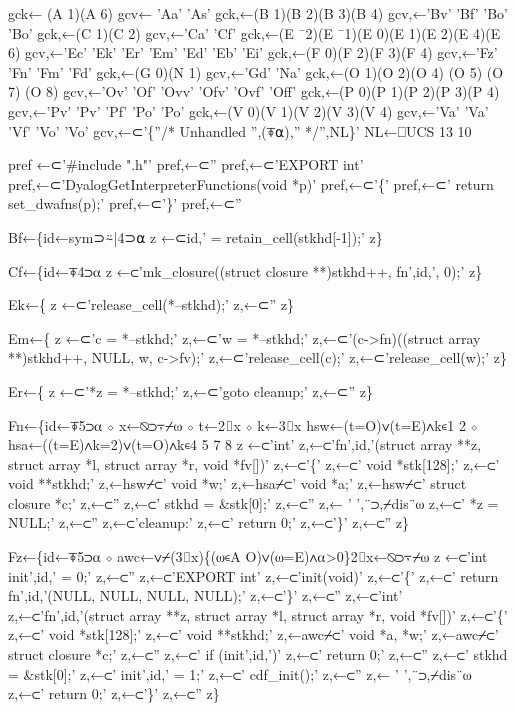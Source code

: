 \documentclass{article}%
\begin{document}
  gck← (A 1)(A 6)
  gcv← 'Aa' 'As'
  gck,←(B 1)(B 2)(B 3)(B 4)
  gcv,←'Bv' 'Bf' 'Bo' 'Bo'
  gck,←(C 1)(C 2)
  gcv,←'Ca' 'Cf'
  gck,←(E ¯2)(E ¯1)(E 0)(E 1)(E 2)(E 4)(E 6)
  gcv,←'Ec'  'Ek'  'Er' 'Em' 'Ed' 'Eb' 'Ei'
  gck,←(F 0)(F 2)(F 3)(F 4)
  gcv,←'Fz' 'Fn' 'Fm' 'Fd'
  gck,←(G 0)(N 1)
  gcv,←'Gd' 'Na'
  gck,←(O 1)(O 2)(O 4) (O 5) (O 7) (O 8)
  gcv,←'Ov' 'Of' 'Ovv' 'Ofv' 'Ovf' 'Off'
  gck,←(P 0)(P 1)(P 2)(P 3)(P 4)
  gcv,←'Pv' 'Pv' 'Pf' 'Po' 'Po'
  gck,←(V 0)(V 1)(V 2)(V 3)(V 4)
  gcv,←'Va' 'Va' 'Vf' 'Vo' 'Vo'
  gcv,←⊂'\{''/* Unhandled '',(⍕⍺),'' */'',NL\}'
  NL←⎕UCS 13 10

  pref ←⊂'#include ".h"'
  pref,←⊂''
  pref,←⊂'EXPORT int'
  pref,←⊂'DyalogGetInterpreterFunctions(void *p)'
  pref,←⊂'\{'
  pref,←⊂'  return set_dwafns(p);'
  pref,←⊂'\}'
  pref,←⊂''

  Bf←\{id←sym⊃⍨|4⊃⍺
    z ←⊂id,' = retain_cell(stkhd[-1]);'
  z\}

  Cf←\{id←⍕4⊃⍺
    z ←⊂'mk_closure((struct closure **)stkhd++, fn',id,', 0);'
  z\}

  Ek←\{
    z ←⊂'release_cell(*--stkhd);'
    z,←⊂''
  z\}

  Em←\{
    z ←⊂'c = *--stkhd;'
    z,←⊂'w = *--stkhd;'
    z,←⊂'(c->fn)((struct array **)stkhd++, NULL, w, c->fv);'
    z,←⊂'release_cell(c);'
    z,←⊂'release_cell(w);'
  z\}

  Er←\{
    z ←⊂'*z = *--stkhd;'
    z,←⊂'goto cleanup;'
    z,←⊂''
  z\}

  Fn←\{id←⍕5⊃⍺ ⋄ x←⍉⊃⍪⌿⍵ ⋄ t←2⌷x ⋄ k←3⌷x
    hsw←(t=O)∨(t=E)∧k∊1 2 ⋄ hsa←((t=E)∧k=2)∨(t=O)∧k∊4 5 7 8
    z ←⊂'int'
    z,←⊂'fn',id,'(struct array **z, struct array *l, struct array *r, void *fv[])'
    z,←⊂'\{'
    z,←⊂'   void    *stk[128];'
    z,←⊂'   void    **stkhd;'
    z,←hsw⌿⊂'     void    *w;'
    z,←hsa⌿⊂'     void    *a;'
    z,←hsw⌿⊂'     struct  closure *c;'
    z,←⊂''
    z,←⊂'   stkhd = &stk[0];'
    z,←⊂''
    z,← '     ',¨⊃,⌿dis¨⍵
    z,←⊂'   *z = NULL;'
    z,←⊂''
    z,←⊂'cleanup:'
    z,←⊂'   return 0;'
    z,←⊂'\}'
    z,←⊂''
  z\}

  Fz←\{id←⍕5⊃⍺ ⋄ awc←∨⌿(3⌷x)\{(⍵∊A O)∨(⍵=E)∧⍺>0\}2⌷x←⍉⊃⍪⌿⍵
    z ←⊂'int init',id,' = 0;'
    z,←⊂''
    z,←⊂'EXPORT int'
    z,←⊂'init(void)'
    z,←⊂'\{'
    z,←⊂'   return fn',id,'(NULL, NULL, NULL, NULL);'
    z,←⊂'\}'
    z,←⊂''
    z,←⊂'int'
    z,←⊂'fn',id,'(struct array **z, struct array *l, struct array *r, void *fv[])'
    z,←⊂'\{'
    z,←⊂'   void    *stk[128];'
    z,←⊂'   void    **stkhd;'
    z,←awc⌿⊂'     void    *a, *w;'
    z,←awc⌿⊂'     struct  closure *c;'
    z,←⊂''
    z,←⊂'   if (init',id,')'
    z,←⊂'           return 0;'
    z,←⊂''
    z,←⊂'   stkhd = &stk[0];'
    z,←⊂'   init',id,' = 1;'
    z,←⊂'   cdf_init();'
    z,←⊂''
    z,← '     ',¨⊃,⌿dis¨⍵
    z,←⊂'   return 0;'
    z,←⊂'\}'
    z,←⊂''
  z\}
\end{document}
